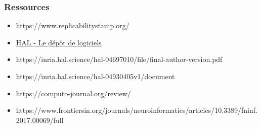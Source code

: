 \begin{frame}[shrink=5]
  \frametitle{Ressources}

  \begin{itemize}
  \item https://www.replicabilitystamp.org/
  \item \href{https://doc.hal.science/ressources/essentiels/CCSD_essentiels_logiciels.fr.pdf}{HAL - Le dépôt de logiciels}
  \item  https://inria.hal.science/hal-04697010/file/final-author-version.pdf
  \item  https://inria.hal.science/hal-04930405v1/document
  \item https://computo-journal.org/review/
   \item   https://www.frontiersin.org/journals/neuroinformatics/articles/10.3389/fninf.2017.00069/full
  \end{itemize}

\end{frame}




